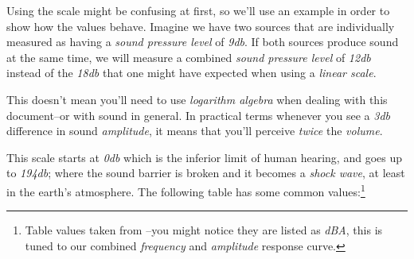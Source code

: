 \documentclass[10pt,a4paper]{report}
\newcommand{\ac}[1]{\textit{\acrshort{#1}}}
\begin{document}
Using the scale might be confusing at first, so we'll use an example in order to show how the values behave. Imagine we have two sources that are individually measured as having a \textit{sound pressure level} of \textit{9\acrshort{db}}. If both sources produce sound at the same time, we will measure a combined \textit{sound pressure level} of \textit{12\acrshort{db}} instead of the \textit{18\acrshort{db}} that one might have expected when using a \textit{linear scale}. 

This doesn't mean you'll need to use \textit{logarithm algebra} when dealing with this document--or with sound in general. In practical terms whenever you see a \textit{3\acrshort{db}} difference in sound \textit{amplitude}, it means that you'll perceive \textit{twice} the \textit{volume}.

This scale starts at \textit{0\ac{db}} which is the inferior limit of human hearing, and goes up to \textit{194\ac{db}}; where the sound barrier is broken and it becomes a \textit{shock wave}, at least in the earth's atmosphere. The following table has some common values:\footnote{Table values taken from \cite{noiselevels}--you might notice they are listed as \textit{dBA}, this is tuned to our combined \textit{frequency} and \textit{amplitude} response curve.}

\begin{center}
\end{center}
\end{document}
